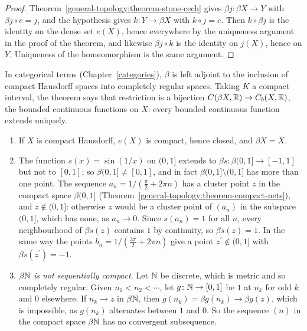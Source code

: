 \begin{proof}
Theorem~\ref{general-topology:theorem-stone-cech} gives $\beta j \colon \beta X \to Y$ with $\beta j \circ e = j$, and the hypothesis gives $k \colon Y \to \beta X$ with $k \circ j = e$. Then $k \circ \beta j$
is the identity on the dense set $e(X)$, hence everywhere by the uniqueness argument in the proof of the theorem, and likewise $\beta j \circ k$ is the identity on $j(X)$, hence on $Y$. Uniqueness of the
homeomorphism is the same argument.
\end{proof}

In categorical terms (Chapter~\ref{categories}), $\beta$ is left adjoint to the inclusion of compact Hausdorff spaces into completely regular spaces. Taking $K$ a compact interval, the theorem says that
restriction is a bijection $C(\beta X, \mathbb{R}) \to C_b(X, \mathbb{R})$, the bounded continuous functions on $X$: every bounded continuous function extends uniquely.

\begin{example}\label{general-topology:example-stone-cech}
\begin{enumerate}
\item If $X$ is compact Hausdorff, $e(X)$ is compact, hence closed, and $\beta X = X$.
\item The function $s(x) = \sin(1/x)$ on $(0, 1]$ extends to $\beta s \colon \beta(0, 1] \to [-1, 1]$ but not to $[0, 1]$; so $\beta(0, 1] \neq [0, 1]$, and in fact $\beta(0, 1] \setminus (0, 1]$ has more than one
point. The sequence $a_n = 1/(\frac\pi2 + 2\pi n)$ has a cluster point $z$ in the compact space $\beta(0, 1]$ (Theorem~\ref{general-topology:theorem-compact-nets}), and $z \notin (0, 1]$: otherwise $z$ would be a cluster
point of $(a_n)$ in the subspace $(0, 1]$, which has none, as $a_n \to 0$. Since $s(a_n) = 1$ for all $n$, every neighbourhood of $\beta s(z)$ contains $1$ by continuity, so $\beta s(z) = 1$. In the same way
the points $b_n = 1/(\frac{3\pi}2 + 2\pi n)$ give a point $z^{\prime} \notin (0, 1]$ with $\beta s(z^{\prime}) = -1$.
\item \emph{$\beta\mathbb{N}$ is not sequentially compact.} Let $\mathbb{N}$ be discrete, which is metric and so completely regular. Given $n_1 < n_2 < \cdots$, let $g \colon \mathbb{N} \to [0, 1]$ be $1$ at $n_k$ for odd $k$
and $0$ elsewhere. If $n_k \to z$ in $\beta\mathbb{N}$, then $g(n_k) = \beta g(n_k) \to \beta g(z)$, which is impossible, as $g(n_k)$ alternates between $1$ and $0$. So the sequence $(n)$ in the compact
space $\beta\mathbb{N}$ has no convergent subsequence.
\end{enumerate}
\end{example}

